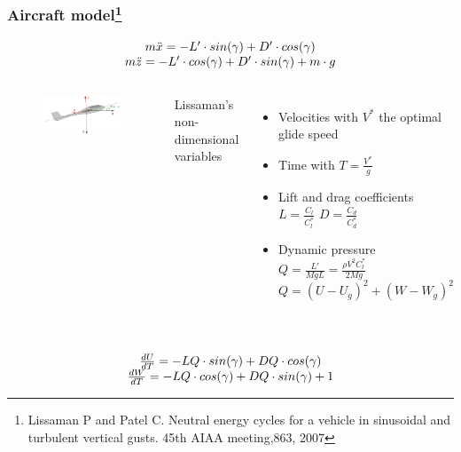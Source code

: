 \documentclass[compress]{beamer}
\begin{document}
\begin{frame}%
  \frametitle{Aircraft model\footnote{\tiny Lissaman P and Patel C. Neutral energy cycles for a vehicle in sinusoidal and turbulent vertical gusts. 45th AIAA meeting,863, 2007}}
  \begin{equation*}
    \begin{array}[c]{c}
      m \ddot{x} = -L' \cdot sin(\gamma) + D' \cdot cos(\gamma) \\
      m \ddot{z} = -L' \cdot cos(\gamma) + D' \cdot sin(\gamma) + m \cdot g
    \end{array}
  \end{equation*}
  \begin{columns}
    \begin{figure}[h]
      \centering
      \includegraphics[width=1\textwidth]{./Figures/glider.eps}
    \end{figure}
    Lissaman's non-dimensional variables
    \begin{itemize}
      \item Velocities with $V^{*}$ the optimal glide speed
      \item Time with $T=\frac{V^{*}}{g}$
      \item Lift and drag coefficients $L= \frac{C_l}{C_l^*}$ $D= \frac{C_d}{C_d^*}$
      \item Dynamic pressure $Q = \frac{L'}{MgL} = \frac{ \rho V^{2} C_l^* }{2Mg}$ $Q=(U-U_g)^2+ (W-W_g)^2$
    \end{itemize}
  \end{columns}
  \begin{equation*}
    \begin{array}[c]{c}
      \\
      \frac{dU}{dT}= -LQ \cdot sin(\gamma) + DQ \cdot cos(\gamma) \\
      \frac{dW}{dT}= -LQ \cdot cos(\gamma) + DQ \cdot sin(\gamma) + 1
    \end{array}
  \end{equation*}
\end{frame}
\end{document}

